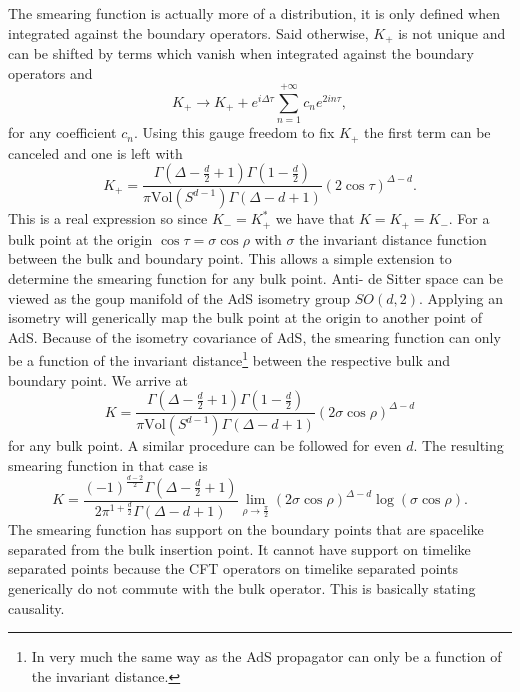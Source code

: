 \documentclass{PoS}
\newcommand{\LF}{\left(}
\newcommand{\RF}{\right)}
\begin{document}
The smearing function is actually more of a distribution, it is only defined when integrated against the boundary operators. Said otherwise, $K_+$ is not unique and can be shifted by terms which vanish when integrated against the boundary operators and
\begin{equation}
K_+ \rightarrow K_+ + e^{i\Delta \tau} \sum\limits_{n=1}^{+\infty} c_n e^{2in\tau},
\end{equation}
for any coefficient $c_n$. Using this gauge freedom to fix $K_+$ the first term can be canceled and one is left with
\begin{equation}
K_+ = \frac{\Gamma\LF \Delta-\frac{d}{2}+1\RF \Gamma \LF 1- \frac{d}{2}\RF}{\pi \text{Vol}(S^{d-1})\Gamma\LF \Delta - d+1\RF} \LF 2\cos\tau\RF^{\Delta-d}.
\end{equation}
This is a real expression so since $K_-= K_+^*$ we have that $K=K_+=K_-$. For a bulk point at the origin $\cos\tau = \sigma\cos\rho$ with $\sigma$ the invariant distance function between the bulk and boundary point. This allows a simple extension to determine the smearing function for any bulk point. Anti- de Sitter space can be viewed as the goup manifold of the AdS isometry group $SO(d,2)$. Applying an isometry will generically map the bulk point at the origin to another point of AdS. Because of the isometry covariance of AdS, the smearing function can only be a function of the invariant distance\footnote{In very much the same way as the AdS propagator can only be a function of the invariant distance.} between the respective bulk and boundary point. We arrive at
\begin{equation}
K = \frac{\Gamma\LF \Delta-\frac{d}{2}+1\RF \Gamma \LF 1- \frac{d}{2}\RF}{\pi \text{Vol}(S^{d-1})\Gamma\LF \Delta - d+1\RF} \LF 2\sigma\cos\rho\RF^{\Delta-d}
\end{equation}
for any bulk point. A similar procedure can be followed for even $d$. The resulting smearing function in that case is
\begin{equation}
K= \frac{ (-1)^{\frac{d-2}{2}} \Gamma\LF \Delta-\frac{d}{2}+1\RF}{ 2\pi^{1+\frac{d}{2}} \Gamma \LF \Delta-d +1\RF} \lim\limits_{\rho\rightarrow \frac{\pi}{2}} \LF 2\sigma \cos\rho\RF^{\Delta-d}\log\LF \sigma\cos\rho\RF.
\end{equation}
The smearing function has support on the  boundary points that are spacelike separated from the bulk insertion point. It cannot have support on timelike separated points because the CFT operators on timelike separated points generically do not commute with the bulk operator. This is basically stating causality.
\end{document}
